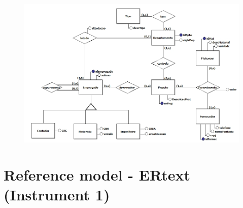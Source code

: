 \begin{figure}[!htb]
    \centering
    \includegraphics[scale=0.5]{postextuais/Instrument2 (brModelo Reference Model).jpg}
    \label{fig:referenceModelbrModeloInst2}
\end{figure}

\newpage

\section{Reference model - ERtext (Instrument 1)}

